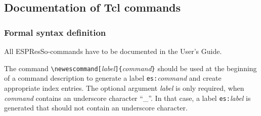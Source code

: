 \documentclass[
a4paper,                        %
11pt,                           %
twoside,                        %
footsepline,                    %
headsepline,                    %
headexclude,                    %
footexclude,                    %
pagesize,                       %
bibtotocnumbered,               %
idxtotoc                        %
]{scrartcl}
\newcommand{\es}{\mbox{\textsf{ESPResSo}}\xspace}
\begin{document}
\subsection{Documentation of Tcl commands}
\label{tcl_docs}

\subsubsection{Formal syntax definition}

All \es-commands have to be documented in the User's Guide.

The command
\verb!\newescommand[!\textit{label}\verb!]{!\textit{command}\verb!}!
should be used at the beginning of a command description to generate a
label \verb!es:!\textit{command} and create appropriate index
entries. The optional argument \textit{label} is only required, when
\textit{command} contains an underscore character ``\_''. In that
case, a label \verb!es:!\textit{label} is generated that should not
contain an underscore character.
\end{document}

